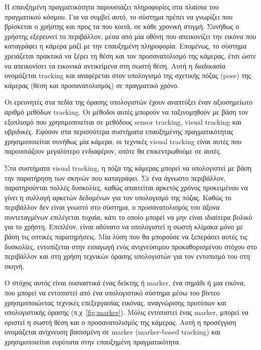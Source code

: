 Η επαυξημένη πραγματικότητα παρουσιάζει πληροφορίες στα πλαίσια του πραγματικού κόσμου. Για να συμβεί αυτό, το σύστημα πρέπει να γνωρίζει που βρίσκεται ο χρήστης και προς τα που κοιτά, σε κάθε χρονική στιγμή. Συνήθως ο χρήστης εξερευνεί το περιβάλλον, μέσα από μία οθόνη που απεικονίζει την εικόνα που καταγράφει η κάμερα μαζί με την επαυξημένη πληροφορία. Επομένως, το σύστημα χρειάζεται πρακτικά να ξέρει τη θέση και τον προσανατολισμό της κάμερας, έτσι ώστε να απεικονίσει τα εικονικά αντικείμενα στη σωστή θέση. Αυτή η διαδικασία ονομάζεται tracking και αναφέρεται στον υπολογισμό της σχετικής πόζας (pose) της κάμερας (θέση και προσανατολισμός) σε πραγματικό χρόνο.


Οι ερευνητές στα πεδία της όρασης υπολογιστών έχουν αναπτύξει έναν αξιοσημείωτο αριθμό μεθόδων tracking. Οι μέθοδοι αυτές μπορούν να ταξινομηθούν με βάση τον εξοπλισμό που χρησιμοποιείται σε μεθόδους sensor tracking, visual tracking και υβριδικές. Εφόσον στα περισσότερα συστήματα επαυξημένης πραγματικότητας χρησιμοποιείται συνήθως μία κάμερα, οι τεχνικές visual tracking είναι αυτές που παρουσιάζουν μεγαλύτερο ενδιαφέρον, οπότε θα επικεντρωθούμε σε αυτές.


Στα συστήματα visual tracking, η πόζα της κάμερας μπορεί να υπολογιστεί με βάση την παρατήρηση των σκηνών που καταγράφει. Σε ένα άγνωστο περιβάλλον, παρατηρούνται πολλές δυσκολίες, καθώς απαιτείται αρκετός χρόνος προκειμένου να γίνει η συλλογή αρκετών δεδομένων για τον υπολογισμό της πόζας. Καθώς το περιβάλλον δεν είναι γνωστό στο σύστημα, ο προσανατολισμός του άξονα συντεταγμένων επιλέγεται τυχαία, κάτι το οποίο μπορεί να μην είναι ιδιαίτερα βολικό για το χρήστη. Επιπλέον, είναι αδύνατο να υπολογιστεί η σωστή κλίμακα μόνο με βάση τις οπτικές παρατηρήσεις. Μία λύση που θα μπορούσε να ξεπεράσει αυτές τις δυσκολίες, εντοπίζεται στην εισαγωγή ενός ανιχνεύσιμου προκαθορισμένου στόχου στο περιβάλλον και στη χρήση τεχνικών όρασης υπολογιστών για τον εντοπισμό του στη σκηνή. 


Ο στόχος αυτός είναι ουσιαστικά ένας δείκτης ή marker, ένα σημάδι ή μια εικόνα, που μπορεί να εντοπιστεί από ένα υπολογιστικό σύστημα μέσω του βίντεο χρησιμοποιώντας τεχνικές επεξεργασίας εικόνας, αναγνώρισης προτύπων και υπολογιστικής όρασης (π.χ~\ref{fig:marker}). Μόλις εντοπιστεί ένας marker, μπορεί να οριστεί η σωστή θέση και ο προσανατολισμός της κάμερας. Αυτή η προσέγγιση ονομάζεται ανίχνευση βασισμένη σε marker (marker-based tracking) και χρησιμοποιείται ευρύτατα στην επαυξημένη πραγματικότητα.%

